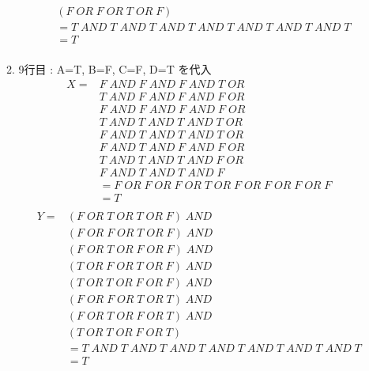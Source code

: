 \documentclass[dvipdfmx,10pt, a4j]{jarticle}
\theoremstyle{definition}
\begin{document}
\begin{enumerate}[i)]
\begin{enumerate}[1)]
\begin{align*}
                & (F\; OR\; F\; OR\; T\; OR\; F)\\
                &= T\; AND\; T\; AND\; T\; AND\; T\; AND\; T\; AND\; T\; AND\; T\; AND\; T\\
                &= T\\
            \end{align*}
            \item 9行目 : A=T, B=F, C=F, D=T を代入\\
            \begin{align*}
                X = &F\; AND\; F\; AND\; F\; AND\; T\; OR\\
                &T\; AND\; F\; AND\; F\; AND\; F\; OR\\
                &F\; AND\; F\; AND\; F\; AND\; F\; OR\\
                &T\; AND\; T\; AND\; T\; AND\; T\; OR\\
                &F\; AND\; T\; AND\; T\; AND\; T\; OR\\
                &F\; AND\; T\; AND\; F\; AND\; F\; OR\\
                &T\; AND\; T\; AND\; T\; AND\; F\; OR\\
                &F\; AND\; T\; AND\; T\; AND\; F\\
                &= F\; OR\; F\; OR\; F\; OR\; T\; OR\; F\; OR\; F\; OR\; F\; OR\; F\\
                &= T\\
            \end{align*}
            \begin{align*}
                Y = & (F\; OR\; T\; OR\; T\; OR\; F) \; AND\\
                & (F\; OR\; F\; OR\; T\; OR\; F)\; AND\\
                & (F\; OR\; T\; OR\; F\; OR\; F)\; AND\\
                & (T\; OR\; F\; OR\; T\; OR\; F)\; AND\\
                & (T\; OR\; T\; OR\; F\; OR\; F)\; AND\\
                & (F\; OR\; F\; OR\; T\; OR\; T)\; AND\\
                & (F\; OR\; T\; OR\; F\; OR\; T)\; AND\\
                & (T\; OR\; T\; OR\; F\; OR\; T)\\
                &= T\; AND\; T\; AND\; T\; AND\; T\; AND\; T\; AND\; T\; AND\; T\; AND\; T\\
                &= T\\

\end{align*}
\end{enumerate}
\end{enumerate}
\end{document}
